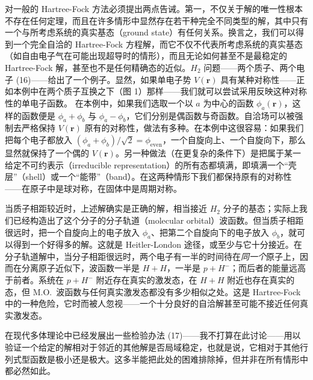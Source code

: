 对一般的 Hartree-Fock 方法必须提出两点告诫。第一，不仅关于解的唯一性根本不存在任何定理，而且在许多情形中显然存在若干种完全不同类型的解，其中只有一个与所考虑系统的真实基态（ground state）有任何关系。换言之，我们可以得到一个完全自洽的 Hartree-Fock 方程解，而它不仅不代表所考虑系统的真实基态（如自由电子气在可能出现超导时的情形），而且无论如何甚至不是最稳定的 Hartree-Fock 解，甚至也不是任何精确态的近似。$H_2$ 问题——两个质子、两个电子 (16)——给出了一个例子。显然，如果单电子势 $V(\mathbf{r})$ 具有某种对称性——正如本例中在两个质子互换之下（图 1）那样——我们就可以尝试采用反映这种对称性的单电子函数。
在本例中，如果我们选取一个以 $a$ 为中心的函数 $\phi_a(\mathbf{r})$，这样的函数便是 $\phi_a+\phi_b$ 与 $\phi_a-\phi_b$，它们分别是偶函数与奇函数。自洽场可以被强制去严格保持 $V(\mathbf{r})$ 原有的对称性，做法有多种。在本例中这很容易：如果我们把每个电子都放入 $(\phi_a+\phi_b)/\sqrt{2}=\phi_{\mathrm{even}}$，一个自旋向上、一个自旋向下，那么显然就保持了一个偶的 $V(\mathbf{r})$。另一种做法（在更复杂的条件下）是把属于某一给定不可约表示（irreducible representation）的所有态都填满，即填满一个“壳层”（shell）或一个“能带”（band）。在这两种情形下我们都保持原有的对称性——在原子中是球对称，在固体中是周期对称。

当质子相距较近时，上述解确实是正确的解，相当接近 $H_2$ 分子的基态；实际上我们已经构造出了这个分子的分子轨道（molecular orbital）波函数。但当质子相距很远时，把一个自旋向上的电子放入 $\phi_a$、把第二个自旋向下的电子放入 $\phi_b$，就可以得到一个好得多的解。这就是 Heitler-London 途径，或至少与它十分接近。在分子轨道解中，当分子相距很远时，两个电子有一半的时间待在\emph{同一个}原子上，因而在分离原子近似下，波函数一半是 $H+H$，一半是 $p+H^-$；而后者的能量远高于前者。系统在 $p+H^-$ 附近存在真实的激发态，在 $H+H$ 附近也存在真实的态，但 M.O.\ 波函数与任何真实激发态都没有多少相似之处。这是 Hartree-Fock 中的一种危险，它时而被人忽视——一个十分良好的自洽解甚至可能不接近任何真实激发态。

在现代多体理论中已经发展出一些检验办法 (17)——我不打算在此讨论——用以验证一个给定的解相对于邻近的其他解是否局域稳定，也就是说，它相对于其他行列式型函数是极小还是极大。这多半能把此处的困难排除掉，但并非在所有情形中都必然如此。

